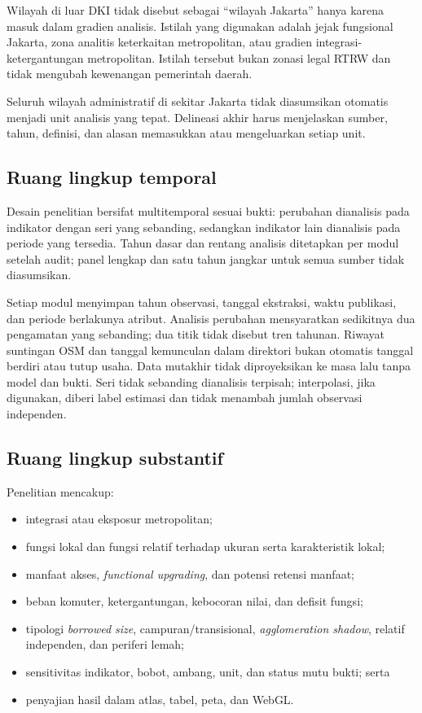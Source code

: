 \documentclass[11pt,a4paper,oneside,openany,indonesian]{report}
\begin{document}
Wilayah di luar DKI tidak disebut sebagai ``wilayah Jakarta'' hanya
karena masuk dalam gradien analisis. Istilah yang digunakan adalah
jejak fungsional Jakarta, zona analitis keterkaitan metropolitan, atau
gradien integrasi-ketergantungan metropolitan. Istilah tersebut bukan zonasi legal RTRW dan tidak
mengubah kewenangan pemerintah daerah.

Seluruh wilayah administratif di sekitar Jakarta tidak diasumsikan
otomatis menjadi unit analisis yang tepat. Delineasi akhir harus
menjelaskan sumber, tahun, definisi, dan alasan memasukkan atau
mengeluarkan setiap unit.

\subsection{Ruang lingkup temporal}\label{ruang-lingkup-temporal}

Desain penelitian bersifat multitemporal sesuai bukti: perubahan
dianalisis pada indikator dengan seri yang sebanding, sedangkan
indikator lain dianalisis pada periode yang tersedia. Tahun dasar dan
rentang analisis ditetapkan per modul setelah audit; panel lengkap dan
satu tahun jangkar untuk semua sumber tidak diasumsikan.

Setiap modul menyimpan tahun observasi, tanggal ekstraksi, waktu
publikasi, dan periode berlakunya atribut. Analisis perubahan
mensyaratkan sedikitnya dua pengamatan yang sebanding; dua titik tidak
disebut tren tahunan. Riwayat suntingan OSM dan tanggal kemunculan dalam
direktori bukan otomatis tanggal berdiri atau tutup usaha. Data mutakhir
tidak diproyeksikan ke masa lalu tanpa model dan bukti. Seri tidak
sebanding dianalisis terpisah; interpolasi, jika digunakan, diberi label
estimasi dan tidak menambah jumlah observasi independen.

\subsection{Ruang lingkup
substantif}\label{ruang-lingkup-substantif}

Penelitian mencakup:

\begin{itemize}
\tightlist
\item
  integrasi atau eksposur metropolitan;
\item
  fungsi lokal dan fungsi relatif terhadap ukuran serta karakteristik
  lokal;
\item
  manfaat akses, \emph{functional upgrading}, dan potensi retensi
  manfaat;
\item
  beban komuter, ketergantungan, kebocoran nilai, dan defisit fungsi;
\item
  tipologi \emph{borrowed size}, campuran/transisional,
  \emph{agglomeration shadow}, relatif independen, dan periferi lemah;
\item
  sensitivitas indikator, bobot, ambang, unit, dan status mutu bukti;
  serta
\item
  penyajian hasil dalam atlas, tabel, peta, dan WebGL.
\end{itemize}
\end{document}
